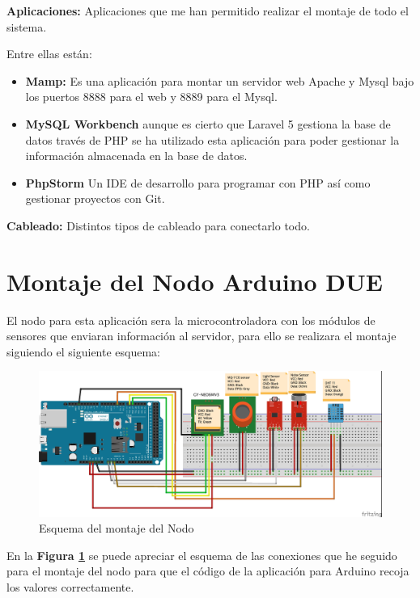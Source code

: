 \textbf{Aplicaciones: } Aplicaciones que me han permitido realizar el montaje de todo el sistema.

Entre ellas están:

\begin{itemize}
	\item \textbf{Mamp:} Es una aplicación para montar un servidor web Apache y Mysql bajo los puertos 8888 para el web y 8889 para el Mysql.
	\item \textbf{MySQL Workbench} aunque es cierto que Laravel 5 gestiona la base de datos través de PHP se ha utilizado esta aplicación para poder gestionar la información almacenada en la base de datos.
	\item \textbf{PhpStorm } Un IDE de desarrollo para programar con PHP así como gestionar proyectos con Git.
\end{itemize}

\textbf{Cableado:} Distintos tipos de cableado para conectarlo todo.

\section{Montaje del Nodo Arduino DUE}

\setlength{\parindent}{5ex}El nodo para esta aplicación sera la microcontroladora con los módulos de sensores que enviaran información al servidor, para ello se realizara el montaje siguiendo el siguiente esquema:\\
\setlength{\parindent}{0ex}
\begin{figure}[!h]
	\centering
	\includegraphics[width=0.9\linewidth]{figuras/ardschema}
	\caption{Esquema del montaje del Nodo}
	\label{fig:imgdue}
\end{figure}

En la \textbf{Figura \ref{fig:imgdue}} se puede apreciar el esquema de las conexiones que he seguido para el montaje del nodo para que el código de la aplicación para Arduino recoja los valores correctamente.


